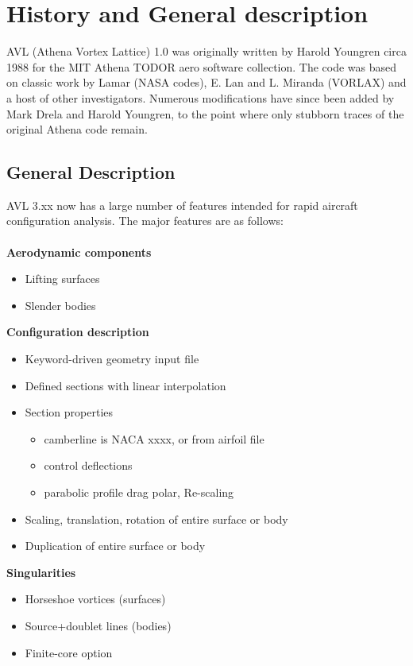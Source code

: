 \chapter{History and General description}
AVL (Athena Vortex Lattice) 1.0 was originally written by Harold Youngren circa 1988 for the MIT Athena TODOR aero software collection.  The code was based on classic work by Lamar (NASA codes), E. Lan and L. Miranda (VORLAX)  and a host of other investigators.  Numerous modifications have since been  added by Mark Drela and Harold Youngren, to the point where only stubborn traces of the original Athena code remain.


\section{General Description}
AVL 3.xx now has a large number of features intended for rapid 
aircraft configuration analysis.  The major features are as follows:\\ \\
%
\textbf{Aerodynamic components}
\begin{itemize}
\item Lifting surfaces
\item Slender bodies	
\end{itemize}
%
\textbf{Configuration description}
\begin{itemize}
	\item Keyword-driven geometry input file
	\item Defined sections with linear interpolation
	\item	Section properties
	 		\begin{itemize}
	 		\item	camberline is NACA xxxx, or from airfoil file
	 		\item	control deflections
	 		\item	parabolic profile drag polar, Re-scaling
	 		\end{itemize}
	 		
	\item	Scaling, translation, rotation of entire surface or body
	\item	Duplication of entire surface or body
\end{itemize}
%
\textbf{Singularities}
\begin{itemize}
	\item Horseshoe vortices   (surfaces)
	\item Source+doublet lines (bodies)
	\item Finite-core option	
\end{itemize}
